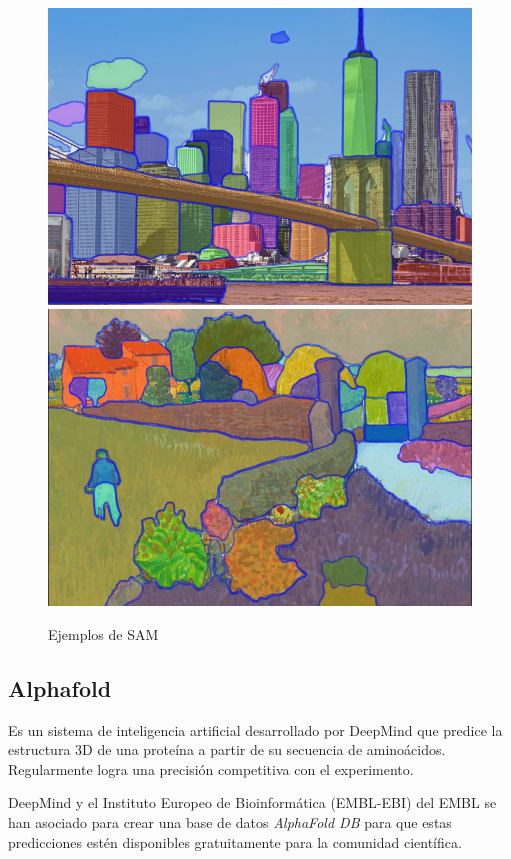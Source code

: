 \documentclass[runningheads]{llncs} %
\begin{document}
\begin{figure}
    \centering
    \includegraphics[scale=0.28]{ej1-SAM.png}
    \includegraphics[scale=0.28]{ej2-SAM.png}
    \caption{Ejemplos de SAM \cite{ej-SAM}}
    \label{fig:ej-SAM}
\end{figure}

\subsection{Alphafold}
Es un sistema de inteligencia artificial desarrollado por DeepMind 
que predice la estructura 3D de una proteína a partir de su secuencia de aminoácidos. 
Regularmente logra una precisión competitiva con el experimento. 

DeepMind y el Instituto Europeo de Bioinformática (EMBL-EBI) del EMBL se han asociado 
para crear una base de datos \textit{AlphaFold DB} para que estas predicciones estén disponibles 
gratuitamente para la comunidad científica. 
\end{document}
